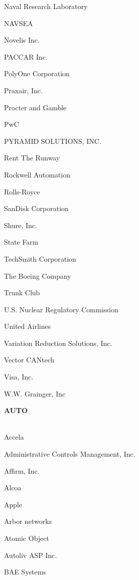 \documentclass[twoside]{article}
\begin{document}
\begin{center}
\begin{multicols}{5}
\begin{FlushLeft}
\begin{compactitem}
\item Naval Research Laboratory
\item NAVSEA
\item Novelis Inc.
\item PACCAR Inc.
\item PolyOne Corporation
\item Praxair, Inc.
\item Procter and Gamble
\item PwC
\item PYRAMID SOLUTIONS, INC.
\item Rent The Runway
\item Rockwell Automation
\item Rolls-Royce
\item SanDisk Corporation
\item Shure, Inc.
\item State Farm
\item TechSmith Corporation
\item The Boeing Company
\item Trunk Club
\item U.S. Nuclear Regulatory Commission
\item United Airlines
\item Variation Reduction Solutions, Inc.
\item Vector CANtech
\item Visa, Inc.
\item W.W. Grainger, Inc
\end{compactitem}
        \end{FlushLeft}
        \vspace{1em}
        {\fontsize{14}{16}\selectfont \bf AUTO}\\
        \vspace{-1em}
        ~\hrulefill~
        \vspace{-.9em}
        \begin{FlushLeft}
        \begin{compactitem}
        \item Accela
\item Administrative Controls Management, Inc.
\item Affirm, Inc.
\item Alcoa
\item Apple
\item Arbor networks
\item Atomic Object
\item Autoliv ASP Inc.
\item BAE Systems

\end{compactitem}
\end{FlushLeft}
\end{multicols}
\end{center}
\end{document}
